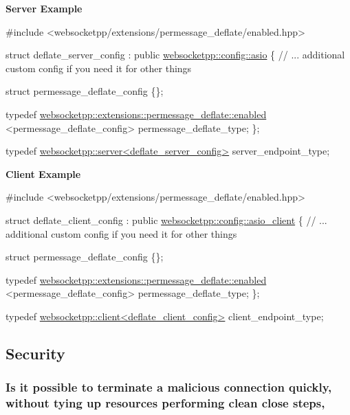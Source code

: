 {\bfseries Server Example} 
\begin{DoxyCode}
\textcolor{preprocessor}{#include <websocketpp/extensions/permessage\_deflate/enabled.hpp>}

\textcolor{keyword}{struct }deflate\_server\_config : \textcolor{keyword}{public} \mbox{\hyperlink{structwebsocketpp_1_1config_1_1asio}{websocketpp::config::asio}} \{
    \textcolor{comment}{// ... additional custom config if you need it for other things}

    \textcolor{keyword}{struct }permessage\_deflate\_config \{\};

    \textcolor{keyword}{typedef} \mbox{\hyperlink{classwebsocketpp_1_1extensions_1_1permessage__deflate_1_1enabled}{websocketpp::extensions::permessage\_deflate::enabled}}
        <permessage\_deflate\_config> permessage\_deflate\_type;
\};

\textcolor{keyword}{typedef} \mbox{\hyperlink{classwebsocketpp_1_1server}{websocketpp::server<deflate\_server\_config>}} 
      server\_endpoint\_type;
\end{DoxyCode}


{\bfseries Client Example} 
\begin{DoxyCode}
\textcolor{preprocessor}{#include <websocketpp/extensions/permessage\_deflate/enabled.hpp>}

\textcolor{keyword}{struct }deflate\_client\_config : \textcolor{keyword}{public} \mbox{\hyperlink{structwebsocketpp_1_1config_1_1asio__client}{websocketpp::config::asio\_client}} \{
    \textcolor{comment}{// ... additional custom config if you need it for other things}

    \textcolor{keyword}{struct }permessage\_deflate\_config \{\};

    \textcolor{keyword}{typedef} \mbox{\hyperlink{classwebsocketpp_1_1extensions_1_1permessage__deflate_1_1enabled}{websocketpp::extensions::permessage\_deflate::enabled}}
        <permessage\_deflate\_config> permessage\_deflate\_type;
\};

\textcolor{keyword}{typedef} \mbox{\hyperlink{classwebsocketpp_1_1client}{websocketpp::client<deflate\_client\_config>}} 
      client\_endpoint\_type;
\end{DoxyCode}


\subsection*{Security}

\subsubsection*{Is it possible to terminate a malicious connection quickly, without tying up resources performing clean close steps,}

